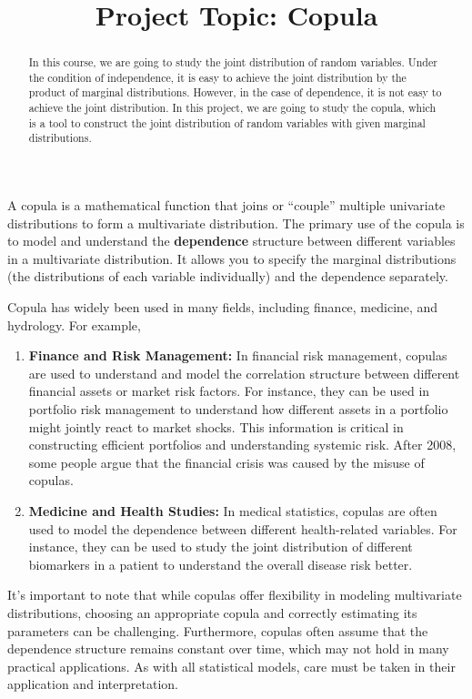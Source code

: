 \documentclass{article}
\title{Project Topic: Copula}
\author{}
\date{}
\begin{document}
\maketitle
\begin{abstract}
    In this course, we are going to study the joint distribution of random variables. Under the condition of independence, it is easy to achieve the joint distribution by the product of marginal distributions. However, in the case of dependence, it is not easy to achieve the joint distribution. In this project, we are going to study the copula, which is a tool to construct the joint distribution of random variables with given marginal distributions.
\end{abstract}

A copula is a mathematical function that joins or ``couple'' multiple univariate distributions to form a multivariate distribution. The primary use of the copula is to model and understand the \textbf{dependence} structure between different variables in a multivariate distribution. It allows you to specify the marginal distributions (the distributions of each variable individually) and the dependence separately.

Copula has widely been used in many fields, including finance, medicine, and hydrology. For example,

\begin{enumerate}
    \item \textbf{Finance and Risk Management:} In financial risk management, copulas are used to understand and model the correlation structure between different financial assets or market risk factors. For instance, they can be used in portfolio risk management to understand how different assets in a portfolio might jointly react to market shocks. This information is critical in constructing efficient portfolios and understanding systemic risk. After 2008, some people argue that the financial crisis was caused by the misuse of copulas.
    \item \textbf{Medicine and Health Studies:} In medical statistics, copulas are often used to model the dependence between different health-related variables. For instance, they can be used to study the joint distribution of different biomarkers in a patient to understand the overall disease risk better.
\end{enumerate}

It's important to note that while copulas offer flexibility in modeling multivariate distributions, choosing an appropriate copula and correctly estimating its parameters can be challenging. Furthermore, copulas often assume that the dependence structure remains constant over time, which may not hold in many practical applications. As with all statistical models, care must be taken in their application and interpretation.
\end{document}
